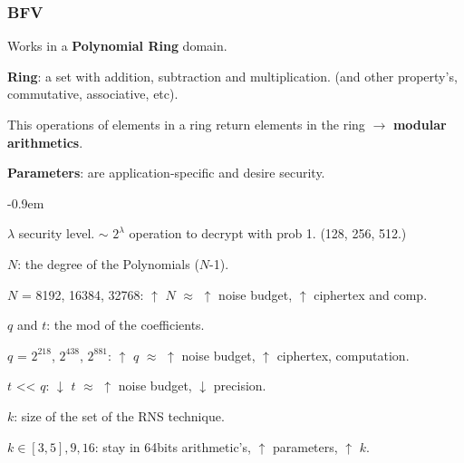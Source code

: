 \documentclass[10pt,handout]{beamer}
\newcommand{\SubItem}[1]{
    {\setlength\itemindent{15pt} \item[-] #1}
}
\begin{document}
\begin{frame}
    \frametitle{BFV}
    Works in a \textbf{Polynomial Ring} domain.

 \vspace{-0.25cm}
\textbf{Ring}: a set with addition, subtraction and multiplication. (and other property's, commutative, associative, etc).

\pause
 \vspace{-0.25cm}
    This operations of elements in a ring return elements in the ring $\rightarrow$  \textbf{modular arithmetics}.

 \vspace{-0.25cm}
\textbf{Parameters}: are application-specific and desire security.

\pause
 \vspace{-0.3cm}
\begin{itemize}\itemsep-0.9em
    \item $\lambda$ security level. $\sim$ $2^\lambda$ operation to decrypt with prob 1. (128, 256, 512.)
    \item $N$: the degree of the Polynomials ($N$-1).
        \SubItem{$N$ = 8192, 16384, 32768: $\uparrow$ $N$ $\approx$ $\uparrow$ noise budget, $\uparrow$ ciphertex and comp.}
\pause
    \item $q$ and $t$: the mod of the coefficients.
        \SubItem{$q$ = $2^{218}$,   $2^{438}$,  $2^{881}$: $\uparrow$ $q$ $\approx$ $\uparrow$ noise budget, $\uparrow$ ciphertex, computation.}
        \SubItem{$t$  << $q$: $\downarrow$ $t$ $\approx$ $\uparrow$ noise budget, $\downarrow$ precision.}
    \item $k$: size of the set of the RNS technique.
        \SubItem{$k\in [3,5], 9, 16$: stay in 64bits arithmetic's, $\uparrow$ parameters, $\uparrow$ $k$.}
\end{itemize}
\pause
\end{frame}


\end{document}
